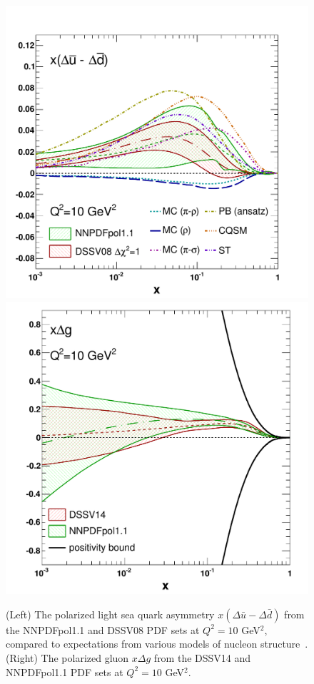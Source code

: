 \begin{figure}[!t]
\centering
\includegraphics[scale=0.35]{plots/asysea_2}
\includegraphics[scale=0.325]{plots/gluoncomp}\\
\caption{(Left) The polarized light sea quark asymmetry 
$x(\Delta\bar{u}-\Delta\bar{d})$ from the NNPDFpol1.1 and 
DSSV08 PDF sets at $Q^2=10$ GeV$^2$, compared to expectations from 
various models of nucleon structure~\cite{Chang:2014jba}. 
(Right) The polarized gluon $x\Delta g$ from the 
DSSV14 and NNPDFpol1.1 PDF sets at $Q^2=10$ GeV$^2$.}
\label{fig:RHICpdfs}
\end{figure}


